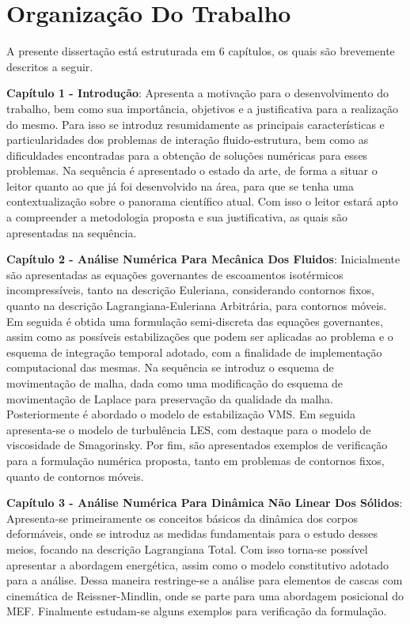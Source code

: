 \section{Organização Do Trabalho}

A presente dissertação está estruturada em 6 capítulos, os quais são brevemente descritos a seguir.

    {
        \newcommand{\Capi}[2]{\textbf{Capítulo #1 - #2}:}

        \Capi{1}{Introdução} Apresenta a motivação para o desenvolvimento do trabalho, bem como sua importância, objetivos e a justificativa para a realização do mesmo. Para isso se introduz resumidamente as principais características e particularidades dos problemas de interação fluido-estrutura, bem como as dificuldades encontradas para a obtenção de soluções numéricas para esses problemas. Na sequência é apresentado o estado da arte, de forma a situar o leitor quanto ao que já foi desenvolvido na área, para que se tenha uma contextualização sobre o panorama científico atual. Com isso o leitor estará apto a compreender a metodologia proposta e sua justificativa, as quais são apresentadas na sequência.

        \Capi{2}{Análise Numérica Para Mecânica Dos Fluidos} Inicialmente são apresentadas as equações governantes de escoamentos isotérmicos incompressíveis, tanto na descrição Euleriana, considerando contornos fixos, quanto na descrição Lagrangiana-Euleriana Arbitrária, para contornos móveis. Em seguida é obtida uma formulação semi-discreta das equações governantes, assim como as possíveis estabilizações que podem ser aplicadas ao problema e o esquema de integração temporal adotado, com a finalidade de implementação computacional das mesmas. Na sequência se introduz o esquema de movimentação de malha, dada como uma modificação do esquema de movimentação de Laplace para preservação da qualidade da malha. Posteriormente é abordado o modelo de estabilização VMS. Em seguida apresenta-se o modelo de turbulência LES, com destaque para o modelo de viscosidade de Smagorinsky. Por fim, são apresentados exemplos de verificação para a formulação numérica proposta, tanto em problemas de contornos fixos, quanto de contornos móveis.

        \Capi{3}{Análise Numérica Para Dinâmica Não Linear Dos Sólidos} Apresenta-se primeiramente os conceitos básicos da dinâmica dos corpos deformáveis, onde se introduz as medidas fundamentais para o estudo desses meios, focando na descrição Lagrangiana Total. Com isso torna-se possível apresentar a abordagem energética, assim como o modelo constitutivo adotado para a análise. Dessa maneira restringe-se a análise para elementos de cascas com cinemática de Reissner-Mindlin, onde se parte para uma abordagem posicional do MEF. Finalmente estudam-se alguns exemplos para verificação da formulação.

}
